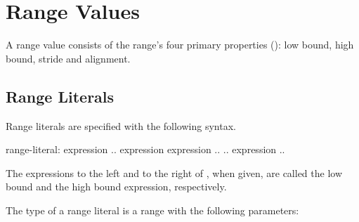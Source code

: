\section{Range Values}
\label{Range_Values}

A range value consists of the range's four primary properties
():
low bound, high bound, stride and alignment.

\subsection{Range Literals}
\label{Range_Literals}

Range literals are specified with the following syntax.

\begin{syntax}
range-literal:
  expression .. expression
  expression ..
  .. expression
  ..
\end{syntax}

The expressions to the left and to the right of , when given,
are called the low bound and the high bound expression, respectively.

The type of a range literal is a range with the following parameters:

